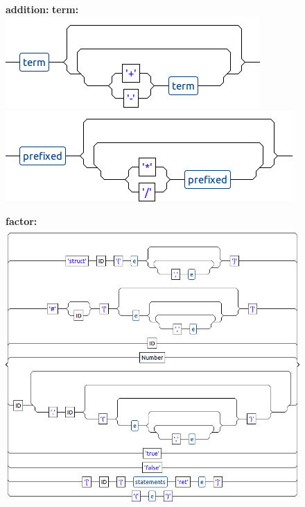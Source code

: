 \begin{figure}[!ht]
\textbf{addition:} \hspace{6cm} \textbf{term:}\\
\vspace{0.2cm}
\hspace{1cm}\includegraphics[scale=0.37]{./annex/images/addition.png} \hspace{3cm}\includegraphics[scale=0.37]{./annex/images/term.png}

\textbf{factor:}\\
\vspace{0.2cm}
\hspace{1cm}\includegraphics[scale=0.37]{./annex/images/factor.png}
\end{figure}